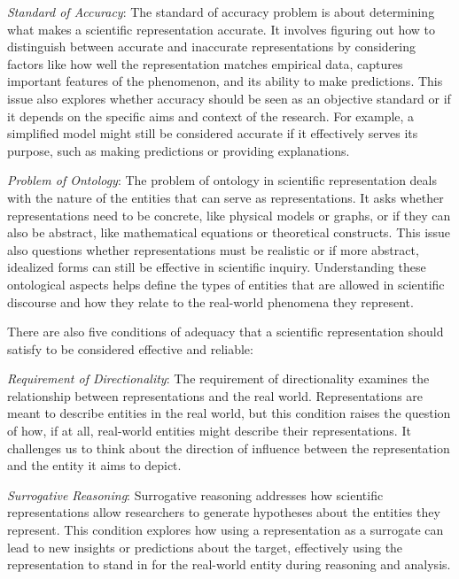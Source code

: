 \emph{Standard of Accuracy}: The standard of accuracy problem is about determining what makes a scientific representation accurate. It involves figuring out how to distinguish between accurate and inaccurate representations by considering factors like how well the representation matches empirical data, captures important features of the phenomenon, and its ability to make predictions. This issue also explores whether accuracy should be seen as an objective standard or if it depends on the specific aims and context of the research. For example, a simplified model might still be considered accurate if it effectively serves its purpose, such as making predictions or providing explanations.

\emph{Problem of Ontology}: The problem of ontology in scientific representation deals with the nature of the entities that can serve as representations. It asks whether representations need to be concrete, like physical models or graphs, or if they can also be abstract, like mathematical equations or theoretical constructs. This issue also questions whether representations must be realistic or if more abstract, idealized forms can still be effective in scientific inquiry. Understanding these ontological aspects helps define the types of entities that are allowed in scientific discourse and how they relate to the real-world phenomena they represent.

There are also five conditions of adequacy that a scientific representation should satisfy to be considered effective and reliable:

\emph{Requirement of Directionality}: The requirement of directionality examines the relationship between representations and the real world. Representations are meant to describe entities in the real world, but this condition raises the question of how, if at all, real-world entities might describe their representations. It challenges us to think about the direction of influence between the representation and the entity it aims to depict.

\emph{Surrogative Reasoning}: Surrogative reasoning addresses how scientific representations allow researchers to generate hypotheses about the entities they represent. This condition explores how using a representation as a surrogate can lead to new insights or predictions about the target, effectively using the representation to stand in for the real-world entity during reasoning and analysis.

